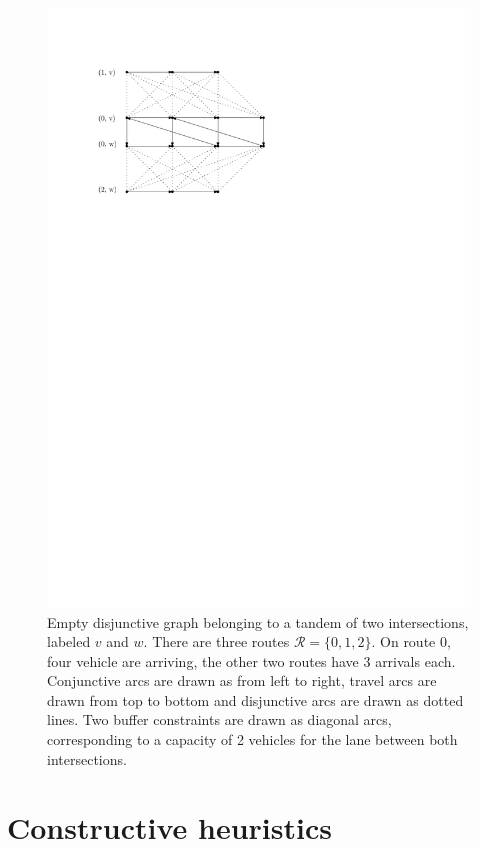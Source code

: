 \documentclass[a4paper]{article}
\theoremstyle{definition}
\theoremstyle{plain}
\begin{document}
\begin{figure}
  \centering
  \includegraphics[scale=1]{figures/network/disjunctive_graph}
  \caption{Empty disjunctive graph belonging to a tandem of two intersections,
    labeled $v$ and $w$. There are three routes $\mathcal{R} = \{0, 1, 2\}$. On
    route 0, four vehicle are arriving, the other two routes have 3 arrivals
    each. Conjunctive arcs are drawn as from left to right, travel arcs are
    drawn from top to bottom and disjunctive arcs are drawn as dotted lines. Two
    buffer constraints are drawn as diagonal arcs, corresponding to a capacity
    of 2 vehicles for the lane between both intersections.}
  \label{fig:disjunctive_graph}
\end{figure}

\newpage
\section{Constructive heuristics}
\end{document}
